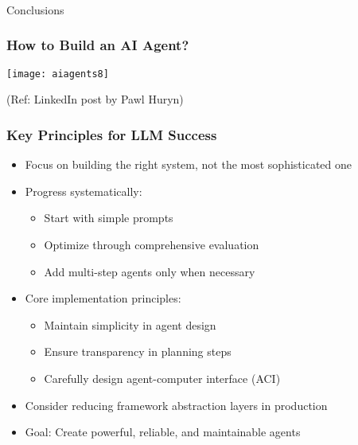\begin{frame}[fragile]\frametitle{}
\begin{center}
{\Large Conclusions}
\end{center}
\end{frame}

\begin{frame}[fragile]\frametitle{How to Build an AI Agent?}

	\begin{center}
	\texttt{[image: aiagents8]}
	
	{\tiny (Ref: LinkedIn post by Pawl Huryn)}
	
	\end{center}
	
\end{frame}


\begin{frame}[fragile]\frametitle{Key Principles for LLM Success}
    \begin{itemize}
        \item Focus on building the right system, not the most sophisticated one
        \item Progress systematically:
            \begin{itemize}
                \item Start with simple prompts
                \item Optimize through comprehensive evaluation
                \item Add multi-step agents only when necessary
            \end{itemize}
        \item Core implementation principles:
            \begin{itemize}
                \item Maintain simplicity in agent design
                \item Ensure transparency in planning steps
                \item Carefully design agent-computer interface (ACI)
            \end{itemize}
        \item Consider reducing framework abstraction layers in production
        \item Goal: Create powerful, reliable, and maintainable agents
    \end{itemize}
\end{frame}

